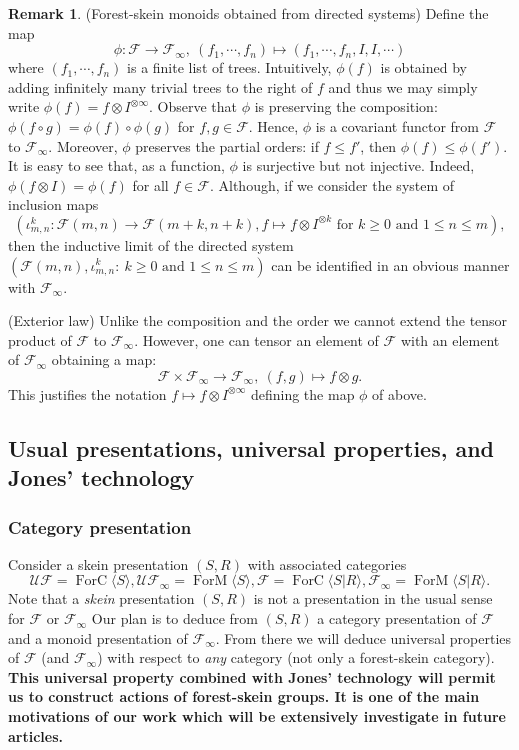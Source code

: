 \documentclass[a4paper, 12pt]{amsart}
\numberwithin{equation}{section}
\theoremstyle{definition}
\newtheorem{remark}[theorem]{Remark}
\newcommand{\cF}{\mathcal F}
\DeclareMathOperator{\FC}{ForC}
\DeclareMathOperator{\FM}{ForM}
\newcommand{\la}{\langle}
\newcommand{\ot}{\otimes}
\newcommand{\ra}{\rangle}
\newcommand{\cUF}{\mathcal{UF}}
\begin{document}
\begin{remark}\label{rk:forest-monoid}
(Forest-skein monoids obtained from directed systems)
Define the map 
$$\phi:\cF\to \cF_\infty,\ (f_1,\cdots,f_n)\mapsto (f_1,\cdots,f_n, I, I,\cdots)$$ where $(f_1,\cdots,f_n)$ is a finite list of trees.
Intuitively, $\phi(f)$ is obtained by adding infinitely many trivial trees to the right of $f$ and thus we may simply write $\phi(f)=f\ot I^{\ot \infty}.$
Observe that $\phi$ is preserving the composition: $\phi(f\circ g)=\phi(f)\circ \phi(g)$ for $f,g\in\cF$. 
Hence, $\phi$ is a covariant functor from $\cF$ to $\cF_\infty$.
Moreover, $\phi$ preserves the partial orders: if $f\leq f'$, then $\phi(f)\leq \phi(f')$.
It is easy to see that, as a function, $\phi$ is surjective but not injective.
Indeed, $\phi(f\ot I) = \phi(f)$ for all $f\in\cF$.
Although, if we consider the system of inclusion maps 
$$(\iota_{m,n}^k:\cF(m,n)\to \cF(m+k,n+k), f\mapsto f\ot I^{\ot k} \text{ for } k\geq 0 \text{ and } 1\leq n\leq m),$$
then the inductive limit of the directed system $(\cF(m,n), \iota_{m,n}^k:\ k\geq 0 \text{ and } 1\leq n\leq m)$ can be identified in an obvious manner with $\cF_\infty.$

(Exterior law)
Unlike the composition and the order we cannot extend the tensor product of $\cF$ to $\cF_\infty$.
However, one can tensor an element of $\cF$ with an element of $\cF_\infty$ obtaining a map:
$$\cF\times \cF_\infty\to \cF_\infty,\ (f, g)\mapsto f\ot g.$$
This justifies the notation $f\mapsto f\ot I^{\ot\infty}$ defining the map $\phi$ of above.
\end{remark}

\subsection{Usual presentations, universal properties, and Jones' technology}\label{sec:universal-property}

\subsubsection{Category presentation}\label{sec:cat-pres}
Consider a skein presentation $(S,R)$ with associated categories 
$$\cUF=\FC\la S\ra, \cUF_\infty=\FM\la S\ra, \cF=\FC\la S|R\ra, \cF_\infty=\FM\la S|R\ra.$$
Note that a {\it skein} presentation $(S,R)$ is not a presentation in the usual sense for $\cF$ or $\cF_\infty$
Our plan is to deduce from $(S,R)$ a category presentation of $\cF$ and a monoid presentation of $\cF_\infty$.
From there we will deduce universal properties of $\cF$ (and $\cF_\infty$) with respect to \textit{any} category (not only a forest-skein category).
{\bf This universal property combined with Jones' technology will permit us to construct actions of forest-skein groups. It is one of the main motivations of our work which will be extensively investigate in future articles.}
\end{document}
